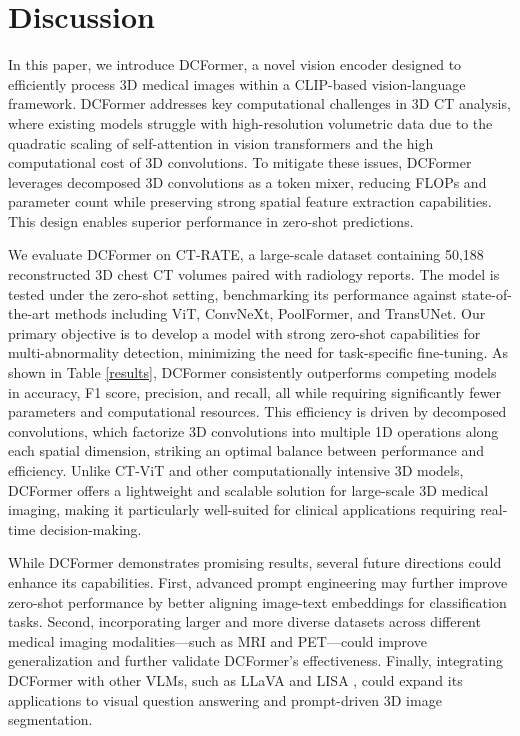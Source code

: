 \section*{Discussion}
In this paper, we introduce DCFormer, a novel vision encoder designed to efficiently process 3D medical images within a CLIP-based vision-language framework. DCFormer addresses key computational challenges in 3D CT analysis, where existing models struggle with high-resolution volumetric data due to the quadratic scaling of self-attention in vision transformers and the high computational cost of 3D convolutions. To mitigate these issues, DCFormer leverages decomposed 3D convolutions as a token mixer, reducing FLOPs and parameter count while preserving strong spatial feature extraction capabilities. This design enables superior performance in zero-shot predictions.

We evaluate DCFormer on CT-RATE, a large-scale dataset containing 50,188 reconstructed 3D chest CT volumes paired with radiology reports. The model is tested under the zero-shot setting, benchmarking its performance against state-of-the-art methods including ViT, ConvNeXt, PoolFormer, and TransUNet. Our primary objective is to develop a model with strong zero-shot capabilities for multi-abnormality detection, minimizing the need for task-specific fine-tuning. As shown in Table \ref{results}, DCFormer consistently outperforms competing models in accuracy, F1 score, precision, and recall, all while requiring significantly fewer parameters and computational resources. This efficiency is driven by decomposed convolutions, which factorize 3D convolutions into multiple 1D operations along each spatial dimension, striking an optimal balance between performance and efficiency. Unlike CT-ViT and other computationally intensive 3D models, DCFormer offers a lightweight and scalable solution for large-scale 3D medical imaging, making it particularly well-suited for clinical applications requiring real-time decision-making.

While DCFormer demonstrates promising results, several future directions could enhance its capabilities. First, advanced prompt engineering may further improve zero-shot performance by better aligning image-text embeddings for classification tasks. Second, incorporating larger and more diverse datasets across different medical imaging modalities—such as MRI and PET—could improve generalization and further validate DCFormer’s effectiveness. Finally, integrating DCFormer with other VLMs, such as LLaVA \cite{liu2024visual} and LISA \cite{lai2024lisa}, could expand its applications to visual question answering and prompt-driven 3D image segmentation.

